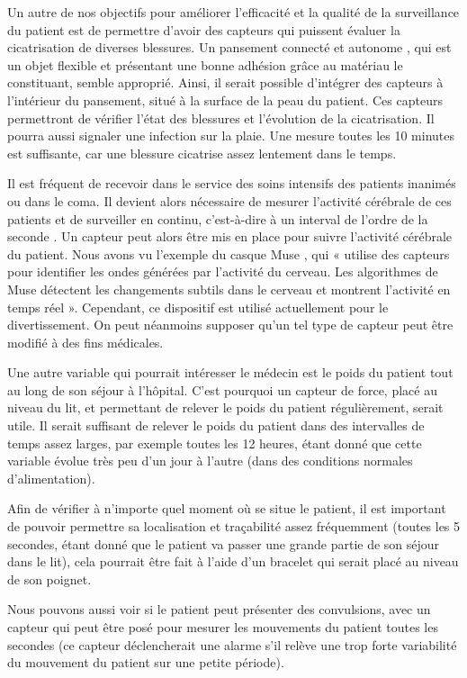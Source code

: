 \documentclass{article}
\begin{document}
Un autre de nos objectifs pour améliorer l’efficacité et la qualité de la surveillance du patient est de permettre d’avoir des capteurs qui puissent évaluer la cicatrisation de diverses blessures. Un pansement connecté et autonome \cite{Pansement}, qui est un objet flexible et présentant une bonne adhésion grâce au matériau le constituant, semble approprié. Ainsi, il serait possible d’intégrer des capteurs à l’intérieur du pansement, situé à la surface de la peau du patient. Ces capteurs permettront de vérifier l’état des blessures et l’évolution de la cicatrisation. Il pourra aussi signaler une infection sur la plaie. Une mesure toutes les 10 minutes est suffisante, car une blessure cicatrise assez lentement dans le temps.

Il est fréquent de recevoir dans le service des soins intensifs des patients inanimés ou dans le coma. Il devient alors nécessaire de mesurer l’activité cérébrale de ces patients et de surveiller en continu, c’est-à-dire à un interval de l'ordre de la seconde . Un capteur peut alors être mis en place pour suivre l’activité cérébrale du patient. Nous avons vu l’exemple du casque Muse \cite{Muse}, qui « utilise des capteurs pour identifier les ondes générées par l’activité du cerveau. Les algorithmes de Muse détectent les changements subtils dans le cerveau et montrent l’activité en temps réel ». Cependant, ce dispositif est utilisé actuellement pour le divertissement. On peut néanmoins supposer qu’un tel type de capteur peut  être modifié à des fins médicales.

Une autre variable qui pourrait intéresser le médecin est le poids du patient tout au long de son séjour à l’hôpital. C’est pourquoi un capteur de force, placé au niveau du lit, et permettant de relever le poids du patient régulièrement, serait utile. Il serait suffisant de relever le poids du patient dans des intervalles de temps assez larges, par exemple toutes les 12 heures, étant donné que cette variable évolue très peu d’un jour à l'autre (dans des conditions normales d'alimentation).

Afin de vérifier à n’importe quel moment où se situe le patient, il est important de pouvoir permettre sa localisation et traçabilité \cite{Localisation} assez fréquemment (toutes les 5 secondes, étant donné que le patient va passer une grande partie de son séjour dans le lit), cela pourrait être fait à l’aide d’un bracelet qui serait placé au niveau de son poignet. 

Nous pouvons aussi voir si le patient peut présenter des convulsions, avec un capteur \cite{Convulsion} qui peut être posé pour mesurer les mouvements du patient toutes les secondes (ce capteur déclencherait une alarme s’il relève une trop forte variabilité du mouvement du patient sur une petite période). 
\end{document}
